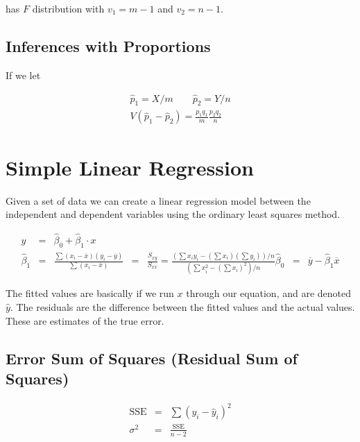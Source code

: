     has $F$ distribution with $v_1 = m - 1$ and $v_2 = n - 1$.

    \subsection{Inferences with Proportions}
    If we let

    \begin{equation*}
        \begin{aligned}
            \hat{p}_1 = X/m \qquad \hat{p}_2 = Y/n\\
            V(\hat{p}_1 - \hat{p}_2) = \frac{p_1 q_1}{m} \frac{p_2 q_2}{n}
        \end{aligned}
    \end{equation*}

\section{Simple Linear Regression}
Given a set of data we can create a linear regression model between the independent and dependent variables using the
ordinary least squares method.

\begin{equation*}
    \begin{aligned}
        y &=& \hat{\beta}_0 + \hat{\beta}_1 \cdot x\\
        \hat{\beta}_1 &=& \frac{\sum \left( x_i - \overline{x} \right)\left( y_i - \overline{y} \right)}{\sum \left( x_i -
            \overline{x} \right)}
            &=& \frac{S_{xy}}{S_{xx}} = \frac{\left( \sum x_i y_i - \left( \sum x_i \right)\left( \sum y_i \right)
            \right)/n}{\left( \sum x^2_i - \left( \sum x_i \right)^2 \right) / n}
        \hat{\beta}_0 &=& \overline{y} - \hat{\beta}_1 \overline{x}
    \end{aligned}
\end{equation*}

The fitted values are basically if we run $x$ through our equation, and are denoted $\hat{y}$. The residuals are the
difference between the fitted values and the actual values. These are estimates of the true error.

    \subsection{Error Sum of Squares (Residual Sum of Squares)}
    \begin{equation*}
        \begin{aligned}
            \text{SSE} &=& \sum \left( y_i - \hat{y}_i \right)^2\\
            \sigma^2 &=& \frac{\text{SSE}}{n - 2}
        \end{aligned}
    \end{equation*}


